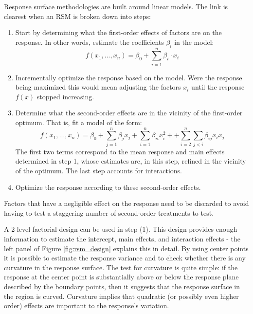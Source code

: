 \documentclass[11pt,a4paper,article]{memoir} %
\begin{document}
Response surface methodologies are built around linear models. The link is clearest when an RSM is broken down into steps:
\begin{enumerate}
\item Start by determining what the first-order effects of factors are on the response. In other words, estimate the coefficients $\beta_i$ in the model:
\begin{equation}
	f(x_1, ..., x_n) = \beta_0 + \sum_{i = 1}^n \beta_i \cdot x_i
\end{equation}
\item Incrementally optimize the response based on the model. Were the response being maximized this would mean adjusting the factors $x_i$ until the response $f(x)$ stopped increasing. 
\item Determine what the second-order effects are in the vicinity of the first-order optimum. That is, fit a model of the form:
\begin{equation}
	f(x_1, ..., x_n) = \beta_0 + \sum_{j = 1}^n \beta_{j} x_j + \sum_{i = 1}^n \beta_{ii} x_i^2 + + \sum_{i = 2}^n \sum_{j < i}\beta_{ij} x_i x_j
\end{equation}
The first two terms correspond to the mean response and main effects determined in step 1, whose estimates are, in this step, refined in the vicinity of the optimum. The last step accounts for interactions.
\item Optimize the response according to these second-order effects.
\end{enumerate}
Factors that have a negligible effect on the response need to be discarded to avoid having to test a staggering number of second-order treatments to test.

A 2-level factorial design can be used in step (1). This design provides enough information to estimate the intercept, main effects, and interaction effects - the left panel of Figure \ref{fig:rsm_design} explains this in detail. By using center points it is possible to estimate the response variance and to check whether there is any curvature in the response surface. The test for curvature is quite simple: if the response at the center point is substantially above or below the response plane described by the boundary points, then it suggests that the response surface in the region is curved. Curvature implies that quadratic (or possibly even higher order) effects are important to the response's variation.
\end{document}
